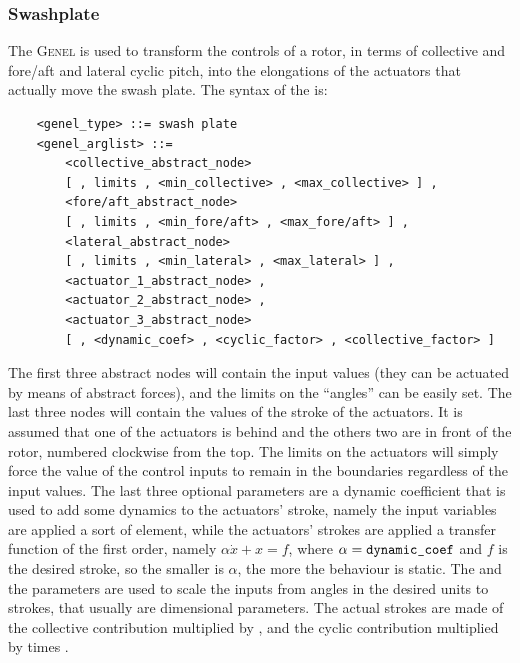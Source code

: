 \subsubsection{Swashplate}
The  \textsc{Genel} is used to transform the controls 
of a rotor, in terms of collective and fore/aft and lateral cyclic pitch, 
into the elongations of the actuators that actually move the swash plate.
The syntax of the  is:
\begin{verbatim}
    <genel_type> ::= swash plate
    <genel_arglist> ::=
        <collective_abstract_node> 
        [ , limits , <min_collective> , <max_collective> ] ,
        <fore/aft_abstract_node> 
        [ , limits , <min_fore/aft> , <max_fore/aft> ] ,
        <lateral_abstract_node> 
        [ , limits , <min_lateral> , <max_lateral> ] ,
        <actuator_1_abstract_node> ,
        <actuator_2_abstract_node> ,
        <actuator_3_abstract_node> 
        [ , <dynamic_coef> , <cyclic_factor> , <collective_factor> ]
\end{verbatim}
The first three abstract nodes will contain the input values (they can be
actuated by means of abstract forces), and the limits on the ``angles'' can
be easily set. 
The last three nodes will contain the values of the stroke of the actuators.
It is assumed that one of the actuators is behind and the others two are in
front of the rotor, numbered clockwise from the top. 
The limits on the actuators will simply force the value of the control
inputs to remain in the boundaries regardless of the input values.
The last three optional parameters are a dynamic coefficient that is used to
add some dynamics to the actuators' stroke, namely the input variables are
applied a sort of   element, while the
actuators' strokes are applied a transfer function of the first order, namely
$ \alpha\dot{x}+x=f $, where $ \alpha=\texttt{dynamic\_coef} $ and $ f $ is
the desired stroke, so the smaller is $ \alpha $, the more the behaviour is
static.
The  and the  parameters are
used to scale the inputs from angles in the desired units to strokes, that
usually are dimensional parameters. The actual strokes are made of the
collective contribution multiplied by , and the
cyclic contribution multiplied by  times 
.

